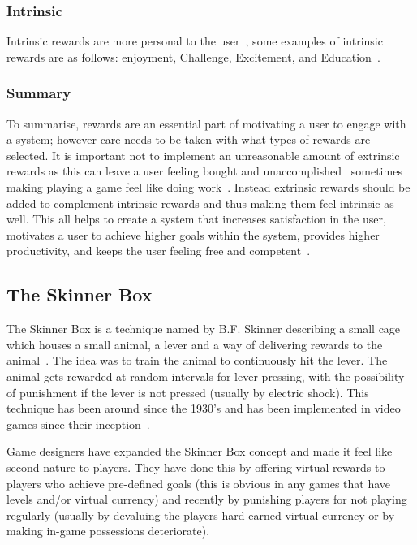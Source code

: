 \documentclass[a4paper,12pt]{article}
\begin{document}
\subsubsection{Intrinsic}\label{sec:intrinsic}
Intrinsic rewards are more personal to the user~\citep{patient-education-and-training}, some examples of intrinsic rewards are as follows: enjoyment, Challenge, Excitement, and Education~\citep{bread-and-games}.

\subsubsection{Summary}
To summarise, rewards are an essential part of motivating a user to engage with a system; however care needs to be taken with what types of rewards are selected. It is important not to implement an unreasonable amount of extrinsic rewards as this can leave a user feeling bought and unaccomplished~\citep{openingSkinersBox,theSkinnerBox,McGonigal:2011:RBW:1972527,bread-and-games} sometimes making playing a game feel like doing work~\citep{turning-play-into-work}. 
Instead extrinsic rewards should be added to complement intrinsic rewards and thus making them feel intrinsic as well. 
This all helps to create a system that increases satisfaction in the user, motivates a user to achieve higher goals within the system, provides higher productivity, and keeps the user feeling free and competent~\citep{intrinsic-motivation}.

\subsection{The Skinner Box}
The Skinner Box is a technique named by B.F. Skinner describing a small cage which houses a small animal, a lever and a way of delivering rewards to the animal~\citep{openingSkinersBox}. 
The idea was to train the animal to continuously hit the lever. 
The animal gets rewarded at random intervals for lever pressing, with the possibility of punishment if the lever is not pressed (usually by electric shock). 
This technique has been around since the 1930’s and has been implemented in video games since their inception~\citep{theSkinnerBox}.

\par
Game designers have expanded the Skinner Box concept and made it feel like second nature to players. 
They have done this by offering virtual rewards to players who achieve pre-defined goals (this is obvious in any games that have levels and/or virtual currency) and recently by punishing players for not playing regularly (usually by devaluing the players hard earned virtual currency or by making in-game possessions deteriorate).
\end{document}
